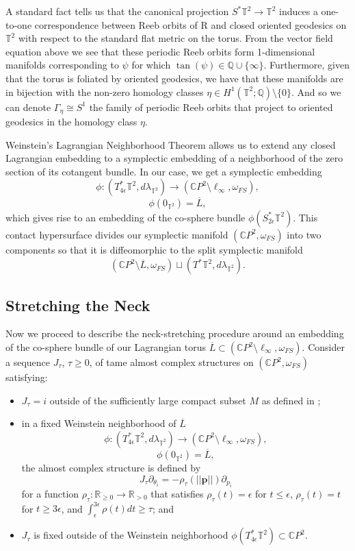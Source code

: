 \documentclass[10pt]{amsart}
\theoremstyle{plain}
\theoremstyle{definition}
\numberwithin{equation}{section}
\newcommand{\Q}{\mathbb{Q}}
\newcommand{\R}{\mathbb{R}}
\newcommand{\C}{\mathbb{C}}
\newcommand{\sse}{\subset}
\newcommand{\sm}{\setminus}
\begin{document}
A standard fact \cite{Geiges08_IntroContact} tells us that the canonical projection $S^* \mathbb{T}^2\to \mathbb{T}^2$ induces a one-to-one correspondence between Reeb orbits of R and closed oriented geodesics on $\mathbb{T}^2$ with respect to the standard flat metric on the torus. From the vector field equation above we see that these periodic Reeb orbits form 1-dimensional manifolds corresponding to $\psi$ for which $\tan(\psi)\in \Q\cup \{\infty\}$. Furthermore, given that the torus is foliated by oriented geodesics, we have that these manifolds are in bijection with the non-zero homology classes $\eta\in H^1(\mathbb{T}^2; \Q)\sm \{0\}$. And so we can denote $\Gamma_\eta \cong S^1$ the family of periodic Reeb orbits that project to oriented geodesics in the homology class $\eta$.

Weinstein's Lagrangian Neighborhood Theorem \cite{Weinstein71_NbhdTheorem} allows us to extend any closed Lagrangian embedding to a symplectic embedding of a neighborhood of the zero section of its cotangent bundle. In our case, we get a symplectic embedding
$$\phi: (T^*_{4\epsilon}\mathbb{T}^2, d\lambda_{\mathbb{T}^2}) \to (\C P^2\sm \ell_\infty, \omega_{FS}),$$
$$\phi(0_{\mathbb{T}^2}) = \overline{L},$$
which gives rise to an embedding of the co-sphere bundle $\phi(S^*_{2\epsilon} \mathbb{T}^2)$. This contact hypersurface divides our symplectic manifold $(\C P^2,\omega_{FS})$ into two components so that it is diffeomorphic to the split symplectic manifold
$$(\C P^2 \sm \overline{L}, \omega_{FS})\sqcup (T^* \mathbb{T}^2, d\lambda_{\mathbb{T}^2}).$$


\subsection{Stretching the Neck}\label{sec:neckstretch} 

Now we proceed to describe the neck-stretching procedure around an embedding of the co-sphere bundle of our Lagrangian torus $\overline{L}\sse (\C P^2\sm \ell_{\infty},\omega_{FS})$. Consider a sequence $J_\tau$, $\tau\geq 0$, of tame almost complex structures on $(\C P^2,\omega_{FS})$ satisfying:
\begin{itemize}
    \item[(i)] $J_\tau=i$ outside of the sufficiently large compact subset $M$ as defined in ;
    
    \item[(ii)] in a fixed Weinstein neighborhood of $\overline{L}$
    $$\phi:(T^*_{4\epsilon}\mathbb{T}^2,d\lambda_{\mathbb{T}^2})\to (\C P^2\sm \ell_{\infty},\omega_{FS}),$$
    $$\phi(0_{\mathbb{T}^2}) = \overline{L},$$
    the almost complex structure is defined by
    $$J_\tau \partial_{\theta_i} = -\rho_\tau(||\textbf{p}||)\partial_{p_i}$$
    for a function $\rho_\tau:\R_{\geq 0}\to \R_{> 0}$ that satisfies $\rho_\tau(t) = \epsilon$ for $t\leq \epsilon$, $\rho_\tau(t) = t$ for $t\geq 3\epsilon$, and $\int_{\epsilon}^{3\epsilon}\rho(t)dt \geq \tau$; and
    
    \item[(iii)] $J_\tau$ is fixed outside of the Weinstein neighborhood $\phi(T^*_{4\epsilon}\mathbb{T}^2) \subset \C P^2$.
\end{itemize}
\end{document}
